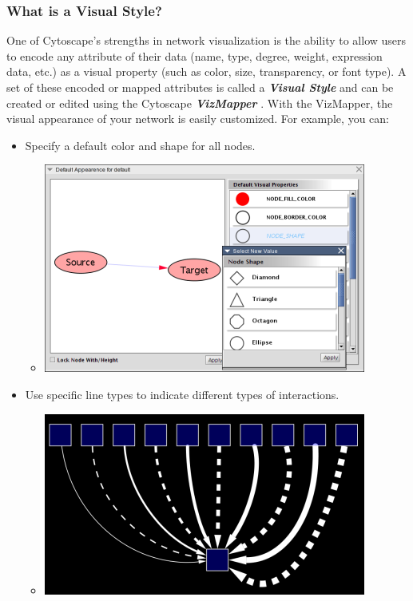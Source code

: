 \subsubsection{What is a Visual Style?}

 One of Cytoscape's strengths in network visualization is the ability to allow users to encode any attribute of their data (name, type, degree, weight, expression data, etc.) as a visual property (such as color, size, transparency, or font type). A set of these encoded or mapped attributes is called a \emph{\textbf{Visual Style}
}
 and can be created or edited using the Cytoscape \emph{\textbf{VizMapper}
}
. With the VizMapper, the visual appearance of your network is easily customized. For example, you can: 
\begin{itemize}
\item Specify a default color and shape for all nodes. \begin{itemize}
\item 

 \includegraphics[width=.6\textwidth]{images/DefaultColorAndShape.png} 


\end{itemize}

\item Use specific line types to indicate different types of interactions. \begin{itemize}
\item 

 \includegraphics[width=.6\textwidth]{images/LineTypes.png} 



\end{itemize}
\end{itemize}
